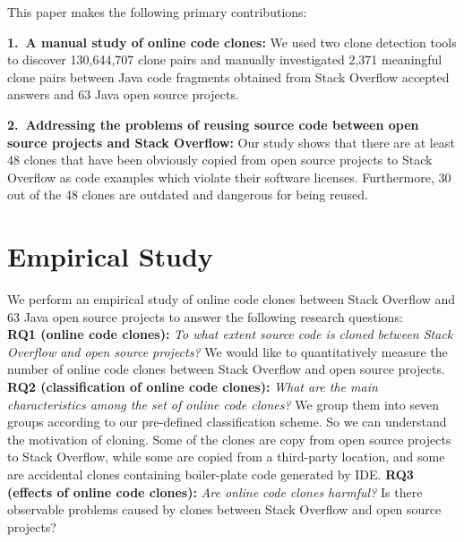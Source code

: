 \documentclass{sig-alternate-05-2015}
\begin{document}
This paper makes the following  primary contributions:

\vspace{0.5ex}%
\noindent\textbf{1.~A manual study of online code clones:} 
We used two clone detection tools to discover 130,644,707 clone pairs and manually investigated 2,371 meaningful clone pairs between Java code fragments obtained from Stack Overflow accepted answers and 63 Java open source projects.

\vspace{0.5ex}%
\noindent\textbf{2.~Addressing the problems of reusing source code between open source projects and Stack Overflow:} Our study shows that there are at least 48 clones that have been obviously copied from open source projects to Stack Overflow as code examples which violate their software licenses. Furthermore, 30 out of the 48 clones are outdated and dangerous for being reused.

\section{Empirical Study}
We perform an empirical study of online code clones between Stack Overflow and 63 Java open source projects to answer the following research questions: \\ 
\textbf{RQ1 (online code clones):} \textit{To what extent  source code is cloned between Stack Overflow and open source projects?} We would like to quantitatively measure the number of online code clones between Stack Overflow and open source projects. \newline
\textbf{RQ2 (classification of online code clones):} \textit{What are the main characteristics among the set of online code clones?} We group them into seven groups according to our pre-defined classification scheme. So we can understand the motivation of cloning. Some of the clones are copy from open source projects to Stack Overflow, while some are copied from a third-party location, and some are accidental clones containing boiler-plate code generated by IDE. \newline
\textbf{RQ3 (effects of online code clones):} \textit{Are online code clones harmful?} Is there observable problems caused by clones between Stack Overflow and open source projects?
\end{document}
